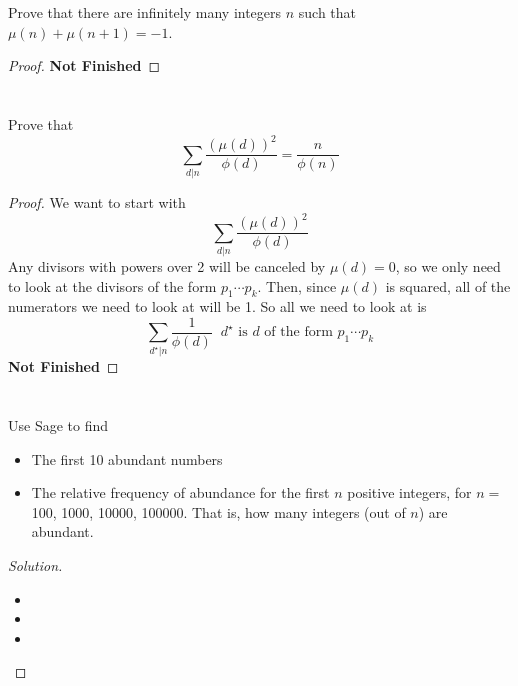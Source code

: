 \documentclass[11pt]{article}
\newenvironment{myproblem}[1][Problem]{\begin{trivlist}
    \item[\hskip \labelsep {\bfseries #1.}]}{\end{trivlist}}
\newenvironment{solution}
  {\renewcommand\qedsymbol{$~$}\begin{proof}[Solution]$ $\par\nobreak\ignorespaces}
  {\end{proof}}
\begin{document}
\section{}

\begin{myproblem}
  Prove that there are infinitely many integers $n$ such that $\mu(n)+\mu(n+1)=-1$.
\end{myproblem}

\begin{proof}
  \textbf{Not Finished}
\end{proof}


\section{}

\begin{myproblem}
  Prove that
  \[
    \sum_{d|n} \frac{(\mu(d))^2}{\phi(d)} = \frac{n}{\phi(n)}
  \]
\end{myproblem}

\begin{proof}
  We want to start with
  \[
    \sum_{d|n} \frac{(\mu(d))^2}{\phi(d)}
  \]
  Any divisors with powers over 2 will be canceled by $\mu(d)=0$, so we only need to look at the divisors of the form $p_1\cdots p_k$. Then, since $\mu(d)$ is squared, all of the numerators we need to look at will be 1. So all we need to look at is
  \[
    \sum_{d^{\star}|n} \frac{1}{\phi(d)} \;\; \text{$d^{\star}$ is $d$ of the form $p_1\cdots p_k$}
  \]
  \textbf{Not Finished}
\end{proof}


\section{}

\begin{myproblem}
  Use Sage to find
  \begin{itemize}
    \item[(a)] The first 10 abundant numbers
    \item[(b)] The relative frequency of abundance for the first $n$ positive integers, for $n=$100, 1000, 10000, 100000. That is, how many integers (out of $n$) are abundant.
  \end{itemize}
\end{myproblem}

\begin{solution}
  \begin{itemize}
    \item [(a)]
          
    \item [(b)]
    \item 
  \end{itemize}
\end{solution}
\end{document}

